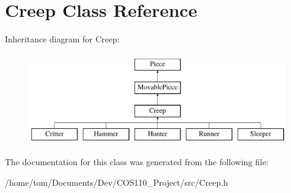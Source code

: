 \hypertarget{classCreep}{\section{Creep Class Reference}
\label{classCreep}
}
Inheritance diagram for Creep\-:\begin{figure}[H]
\begin{center}
\leavevmode
\includegraphics[height=4.000000cm]{classCreep}
\end{center}
\end{figure}


The documentation for this class was generated from the following file\-:\begin{DoxyCompactItemize}
\item 
/home/tom/\-Documents/\-Dev/\-C\-O\-S110\-\_\-\-Project/src/Creep.\-h\end{DoxyCompactItemize}
